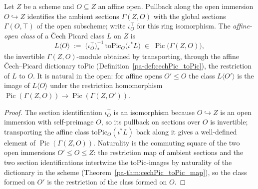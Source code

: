 \begin{definition}
  \label{pa-def:cechPicClass_affineOpen}
  \leanok

  Let \(Z\) be a scheme and \(O \subseteq Z\) an affine open. Pullback along the open immersion \(O
  \hookrightarrow Z\) identifies the ambient sections \(\Gamma(Z, O)\) with the global sections
  \(\Gamma(O, \top)\) of the open subscheme; write \(\iota_O^{\top}\) for this ring isomorphism. The
  \emph{affine-open class} of a \v Cech Picard class \(L\) on \(Z\) is
  \[
    L\langle O\rangle \;:=\; \bigl(\iota_O^{\top}\bigr)^{-1}_{*}\,
      \mathrm{toPic}_O\bigl(\iota^{*}L\bigr) \;\in\; \operatorname{Pic}\bigl(\Gamma(Z, O)\bigr),
  \]
  the invertible \(\Gamma(Z, O)\)-module obtained by transporting, through the affine \v
  Cech--Picard dictionary \(\mathrm{toPic}\) (Definition~\ref{pa-def:cechPic_toPic}), the restriction of
  \(L\) to \(O\). It is natural in the open: for affine opens \(O' \le O\) the class \(L\langle
  O'\rangle\) is the image of \(L\langle O\rangle\) under the restriction homomorphism
  \(\operatorname{Pic}(\Gamma(Z, O)) \to \operatorname{Pic}(\Gamma(Z, O'))\).
\end{definition}
\begin{proof}
  \leanok
  The section identification \(\iota_O^{\top}\) is an isomorphism because \(O \hookrightarrow Z\) is
  an open immersion with self-preimage \(O\), so its pullback on sections over \(O\) is invertible;
  transporting the affine class \(\mathrm{toPic}_O(\iota^{*}L)\) back along it gives a well-defined
  element of \(\operatorname{Pic}(\Gamma(Z, O))\). Naturality is the commuting square of the two open
  immersions \(O' \le O \le Z\): the restriction map of ambient sections and the two section
  identifications intertwine the \(\mathrm{toPic}\)-images by naturality of the dictionary in the
  scheme (Theorem~\ref{pa-thm:cechPic_toPic_map}), so the class formed on \(O'\) is the restriction of
  the class formed on \(O\).
\end{proof}

